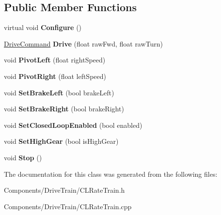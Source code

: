 \subsection*{\-Public \-Member \-Functions}
\begin{DoxyCompactItemize}
\item 
\hypertarget{class_c_l_rate_train_a8caad2ebfbf35831f82f166feb61e1d2}{
virtual void {\bfseries \-Configure} ()}
\label{class_c_l_rate_train_a8caad2ebfbf35831f82f166feb61e1d2}

\item 
\hypertarget{class_c_l_rate_train_aee32558673c8ed3066e3ef90d367bfee}{
\hyperlink{struct_drive_command}{\-Drive\-Command} {\bfseries \-Drive} (float raw\-Fwd, float raw\-Turn)}
\label{class_c_l_rate_train_aee32558673c8ed3066e3ef90d367bfee}

\item 
\hypertarget{class_c_l_rate_train_a2a21f0b94af23c568e819a0dbc5b0ad5}{
void {\bfseries \-Pivot\-Left} (float right\-Speed)}
\label{class_c_l_rate_train_a2a21f0b94af23c568e819a0dbc5b0ad5}

\item 
\hypertarget{class_c_l_rate_train_a54194416422229468c15af35e53a2a37}{
void {\bfseries \-Pivot\-Right} (float left\-Speed)}
\label{class_c_l_rate_train_a54194416422229468c15af35e53a2a37}

\item 
\hypertarget{class_c_l_rate_train_a6bf5b692f606cc37d0e51ce2a55f072a}{
void {\bfseries \-Set\-Brake\-Left} (bool brake\-Left)}
\label{class_c_l_rate_train_a6bf5b692f606cc37d0e51ce2a55f072a}

\item 
\hypertarget{class_c_l_rate_train_a290a76619d16046157b5a412a772d086}{
void {\bfseries \-Set\-Brake\-Right} (bool brake\-Right)}
\label{class_c_l_rate_train_a290a76619d16046157b5a412a772d086}

\item 
\hypertarget{class_c_l_rate_train_a3183a395167e566639a67167c81260c2}{
void {\bfseries \-Set\-Closed\-Loop\-Enabled} (bool enabled)}
\label{class_c_l_rate_train_a3183a395167e566639a67167c81260c2}

\item 
\hypertarget{class_c_l_rate_train_a87cdf4fe6e2122bc416d722e2544bdaa}{
void {\bfseries \-Set\-High\-Gear} (bool is\-High\-Gear)}
\label{class_c_l_rate_train_a87cdf4fe6e2122bc416d722e2544bdaa}

\item 
\hypertarget{class_c_l_rate_train_a12335053497ce85ae2bd63637de84d21}{
void {\bfseries \-Stop} ()}
\label{class_c_l_rate_train_a12335053497ce85ae2bd63637de84d21}

\end{DoxyCompactItemize}


\-The documentation for this class was generated from the following files\-:\begin{DoxyCompactItemize}
\item 
\-Components/\-Drive\-Train/\-C\-L\-Rate\-Train.\-h\item 
\-Components/\-Drive\-Train/\-C\-L\-Rate\-Train.\-cpp\end{DoxyCompactItemize}
